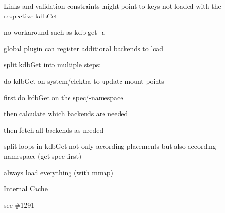 Links and validation constraints might point to keys not loaded with the respective {\ttfamily kdb\+Get}.


\begin{DoxyItemize}
\item no workaround such as {\ttfamily kdb get -\/a}
\end{DoxyItemize}


\begin{DoxyItemize}
\item global plugin can register additional backends to load
\item split {\ttfamily kdb\+Get} into multiple steps\+:
\begin{DoxyEnumerate}
\item do {\ttfamily kdb\+Get} on {\ttfamily system/elektra} to update mount points
\item first do {\ttfamily kdb\+Get} on the {\ttfamily spec/}-\/namespace
\item then calculate which backends are needed
\item then fetch all backends as needed
\end{DoxyEnumerate}
\item split loops in {\ttfamily kdb\+Get} not only according placements but also according namespace (get spec first)
\end{DoxyItemize}


\begin{DoxyItemize}
\item always load everything (with mmap)
\end{DoxyItemize}


\begin{DoxyItemize}
\item \hyperlink{doc_decisions_internal_cache_md}{Internal Cache}
\end{DoxyItemize}

see \#1291 